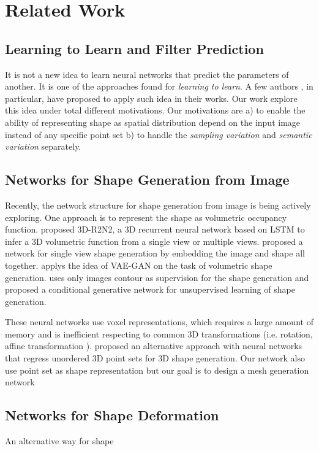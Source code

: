 \section{Related Work}
\subsection{Learning to Learn and Filter Prediction}
It is not a new idea to learn neural networks that predict the parameters of another. It is one of the approaches found for \textit{learning to learn}.  A few authors \cite{schmidhuber1992learning,bertinetto2016learning,jia2016dynamic} , in particular, have proposed to apply such idea in their works. Our work explore this idea under total different motivations. Our motivations are a) to enable the ability of representing shape as spatial distribution depend on the input image instead of any specific point set b) to handle the \textit{sampling variation} and \textit{semantic variation} separately. 

\subsection{Networks for Shape Generation from Image}
Recently, the network structure for shape generation from image is being actively exploring. One approach is to represent the shape as volumetric occupancy function. \cite{3DR2N2} proposed 3D-R2N2, a 3D recurrent neural network based on LSTM to infer a 3D volumetric function from a single view or multiple views. \cite{girdhar2016learning} proposed a network for single view shape generation by embedding the image and shape all together. \cite{NIPS2016_6096} applys the idea of VAE-GAN on the task of volumetric shape generation. \cite{NIPS2016_6206} uses only images contour as supervision for the shape generation and \cite{NIPS2016_6600} proposed a conditional generative network for unsupervised learning of shape generation. 

These neural networks use voxel representations, which
requires a large amount of memory and is inefficient respecting to common 3D transformations (i.e. rotation, affine transformation ). \cite{PSGN} proposed an alternative approach with neural networks that regress unordered
3D point sets for 3D shape generation. Our network also use point set as shape representation but our goal is to design a mesh generation network

\subsection{Networks for Shape Deformation}
An alternative way for shape 
